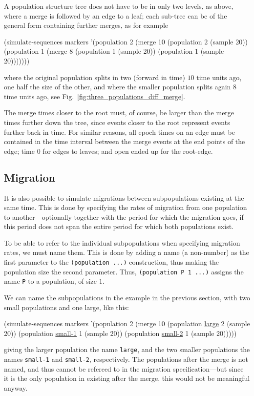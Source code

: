 \documentclass{manual}
\begin{document}
\begin{empfile}
A population structure tree does not have to be in only two levels, as
above, where a merge is followed by an edge to a leaf; each sub-tree
can be of the general form containing further merges, as for example
\begin{code}
(simulate-sequences markers
   '(population 2
       (merge 10 (population 2 (sample 20))
                 (population 1 (merge 8 (population 1 (sample 20))
                                        (population 1 (sample 20)))))))
\end{code}
where the original population splits in two (forward in time) $10$
time units ago, one half the size of the other, and where the smaller
population splits again $8$ time units ago, see
Fig.~\ref{fig:three_populations_diff_merge}.

The merge times closer to the root must, of course, be larger than the
merge times further down the tree, since events closer to the root
represent events further back in time.  For similar reasons, all
epoch times on an edge must be contained in the time interval between
the merge events at the end points of the edge; time $0$ for edges to
leaves; and open ended up for the root-edge.


\subsection{Migration}
\label{sec:migration}

It is also possible to simulate migrations between subpopulations
existing at the same time.  This is done by specifying the rates of
migration from one population to another---optionally together with
the period for which the migration goes, if this period does not span
the entire period for which both populations exist.

To be able to refer to the individual subpopulations when specifying
migration rates, we must name them.  This is done by adding a name (a
non-number) as the first parameter to the \texttt{(population ...)}
construction, thus making the population size the second parameter.
Thus, \texttt{(population P 1 ...)} assigns the name \texttt{P} to a
population, of size $1$.

We can name the subpopulations in the example in the previous section,
with two small populations and one large, like this:
\begin{code}
(simulate-sequences markers
   '(population 2 (merge 10 (population \underline{large}   2 (sample 20))
                            (population \underline{small-1} 1 (sample 20))
                            (population \underline{small-2} 1 (sample 20)))))
\end{code}
giving the larger population the name \texttt{large}, and the two
smaller populations the names \texttt{small-1} and \texttt{small-2},
respectively.  The populations after the merge is not named, and thus
cannot be refereed to in the migration specification---but since it is
the only population in existing after the merge, this would not be
meaningful anyway.


\end{empfile}
\end{document}
